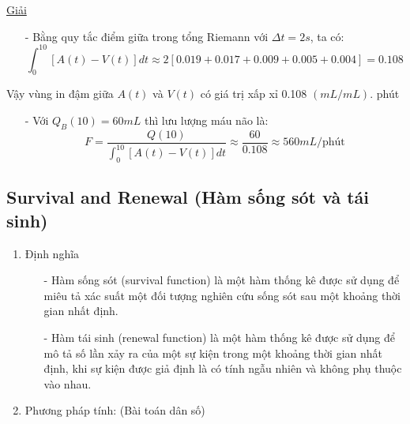 \documentclass[12pt,a4paper]{article}
\begin{document}
\begin{enumerate}[a/]
\begin{itemize}
          \end{itemize}
          \centering\underline{Giải}
          \begin{itemize}
            \item[-] Bằng quy tắc điểm giữa trong tổng Riemann với $\Delta t=2s$, ta có:
            $$\int_{0}^{10}\left[A(t)-V(t)\right]dt\approx 2\left[0.019+0.017+0.009+0.005+0.004\right]=0.108$$
          \end{itemize}
          \begin{flushleft}
            Vậy vùng in đậm giữa $A(t)$ và $V(t)$ có giá trị xấp xỉ 0.108 $(mL/mL)$. phút
          \end{flushleft}
          \begin{itemize}
            \item[-] Với $Q_B(10)=60mL$ thì lưu lượng máu não là:
            $$F=\frac{Q(10)}{\displaystyle \int_{0}^{10}\left[A(t)-V(t)\right]dt} \approx \frac{60}{0.108} \approx 560mL/\text{phút}$$
          \end{itemize}
\end{enumerate}

\newpage
\subsection{Survival and Renewal (Hàm sống sót và tái sinh)}
\begin{enumerate}[a/]
    \item Định nghĩa
        \begin{itemize}
            \item[-] Hàm sống sót (survival function) là một hàm thống kê được sử dụng để miêu tả xác suất một đối tượng nghiên cứu sống sót sau một khoảng thời gian nhất định.
            \item[-] Hàm tái sinh (renewal function) là một hàm thống kê được sử dụng để mô tả số lần xảy ra của một sự kiện trong một khoảng thời gian nhất định, khi sự kiện được giả định là có tính ngẫu nhiên và không phụ thuộc vào nhau.
        \end{itemize}
    \item Phương pháp tính: (Bài toán dân số)
\end{enumerate}

\newpage
{}
\end{document}
